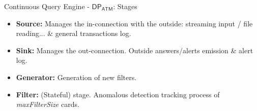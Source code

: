 
\begin{comment}
\begin{frame}{Continuous Query Engine: $\mathsf{DP_{ATM}}$}
    \begin{figure}
        \hspace*{-1cm} %
        \texttt{[image: figures/architecture.png]}
    \end{figure}
\end{frame}
\end{comment}

\begin{comment}
\begin{frame}{$\mathsf{DP_{ATM}}$ - Input Stream}
\textbf{Note}: 2 edges per transaction - the \emph{opening} edge and the \emph{closing} edge.

\begin{figure}
    \centering
    \only<1>{\texttt{[image: images/1-DataModel/2-edges-tx-tfm.png]}}
    \only<2>{\texttt{[image: images/1-DataModel/2-edges-tx-tfm-1.png]}}
    \caption{\only<1>{Opening edge}\only<2>{Closing edge}}
\end{figure}
\end{frame}
\end{comment}

\begin{frame}{Continuous Query Engine - $\mathsf{DP_{ATM}}$: Stages}
    \begin{itemize}
        \item<1-> \textbf{Source:} Manages the in-connection with the outside: streaming input / file reading... \& general transactions log.
        \item<2-> \textbf{Sink:} Manages the out-connection. Outside answers/alerts emission \& alert log.
        \item<3-> \textbf{Generator:} Generation of new filters.
        \item<4-> \textbf{Filter:} (Stateful) stage. Anomalous detection tracking process of \emph{maxFilterSize} cards.
    \end{itemize}
    \begin{figure}
    \hspace*{-0.9cm}
    \centering
\end{figure}
\end{frame}


